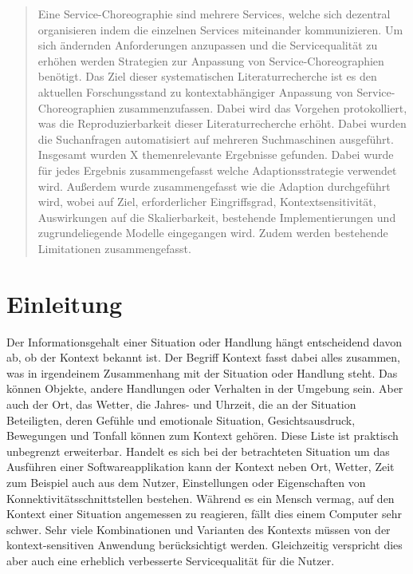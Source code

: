 \documentclass[conference,compsoc]{IEEEtran}
\begin{document}
\begin{abstract}
Eine Service-Choreographie sind mehrere Services, welche sich dezentral organisieren indem die einzelnen Services miteinander kommunizieren. Um sich ändernden Anforderungen anzupassen und die Servicequalität zu erhöhen werden Strategien zur Anpassung von Service-Choreographien benötigt.
Das Ziel dieser systematischen Literaturrecherche ist es den aktuellen Forschungsstand zu kontextabhängiger Anpassung von Service-Choreographien zusammenzufassen. Dabei wird das Vorgehen protokolliert, was die Reproduzierbarkeit dieser Literaturrecherche erhöht. Dabei wurden die Suchanfragen automatisiert auf mehreren Suchmaschinen ausgeführt. Insgesamt wurden X %
themenrelevante Ergebnisse gefunden. Dabei wurde für jedes Ergebnis zusammengefasst welche Adaptionsstrategie verwendet wird. Außerdem wurde zusammengefasst wie die Adaption durchgeführt wird, wobei auf Ziel, erforderlicher Eingriffsgrad, Kontextsensitivität, Auswirkungen auf die Skalierbarkeit, bestehende Implementierungen und zugrundeliegende Modelle eingegangen wird. Zudem werden bestehende Limitationen zusammengefasst.
\end{abstract}





%
\IEEEpeerreviewmaketitle



\section{Einleitung}
Der Informationsgehalt einer Situation oder Handlung hängt entscheidend davon ab, ob der Kontext bekannt ist. Der Begriff Kontext fasst dabei alles zusammen, was in irgendeinem Zusammenhang mit der Situation oder Handlung steht. Das können Objekte, andere Handlungen oder Verhalten in der Umgebung sein. Aber auch der Ort, das Wetter, die Jahres- und Uhrzeit, die an der Situation Beteiligten, deren Gefühle und emotionale Situation, Gesichtsausdruck, Bewegungen und Tonfall können zum Kontext gehören. Diese Liste ist praktisch unbegrenzt erweiterbar. Handelt es sich bei der betrachteten Situation um das Ausführen einer Softwareapplikation kann der Kontext neben Ort, Wetter, Zeit zum Beispiel auch aus dem Nutzer, Einstellungen oder Eigenschaften von Konnektivitätsschnittstellen bestehen. Während es ein Mensch vermag, auf den Kontext einer Situation angemessen zu reagieren, fällt dies einem Computer sehr schwer. Sehr viele Kombinationen und Varianten des Kontexts müssen von der kontext-sensitiven Anwendung berücksichtigt werden. Gleichzeitig verspricht dies aber auch eine erheblich verbesserte Servicequalität für die Nutzer.
\end{document}
